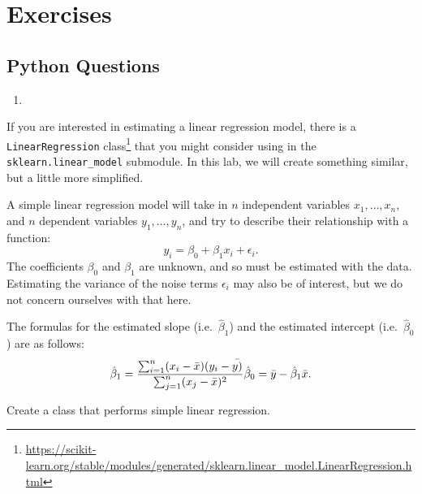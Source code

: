 \documentclass[
  12pt,
  krantz2]{krantz}
\providecommand{\tightlist}{%
  \setlength{\itemsep}{0pt}\setlength{\parskip}{0pt}}
\renewcommand{\href}[2]{#2\footnote{\url{#1}}}
\begin{document}
\hypertarget{exercises-11}{%
\section{Exercises}\label{exercises-11}}

\hypertarget{python-questions-10}{%
\subsection{Python Questions}\label{python-questions-10}}

\begin{enumerate}
\def\labelenumi{\arabic{enumi}.}
\tightlist
\item
\end{enumerate}

If you are interested in estimating a linear regression model, there is a \href{https://scikit-learn.org/stable/modules/generated/sklearn.linear_model.LinearRegression.html}{\texttt{LinearRegression} class} that you might consider using in the \texttt{sklearn.linear\_model} submodule. In this lab, we will create something similar, but a little more simplified.

A simple linear regression model will take in \(n\) independent variables \(x_1, \ldots, x_n\), and \(n\) dependent variables \(y_1, \ldots, y_n\), and try to describe their relationship with a function:
\[
y_i = \beta_0 + \beta_1 x_i + \epsilon_i.
\]
The coefficients \(\beta_0\) and \(\beta_1\) are unknown, and so must be estimated with the data. Estimating the variance of the noise terms \(\epsilon_i\) may also be of interest, but we do not concern ourselves with that here.

The formulas for the estimated slope (i.e.~\(\hat{\beta}_1\)) and the estimated intercept (i.e.~\(\hat{\beta}_0\)) are as follows:
\[
\hat{\beta}_1 = \frac{\sum_{i=1}^n (x_i - \bar{x})(y_i-\bar{y)}}{\sum_{j=1}^n (x_j - \bar{x})^2} \\
\hat{\beta}_0 = \bar{y} - \hat{\beta}_1\bar{x}.
\]

Create a class that performs simple linear regression.
\end{document}

